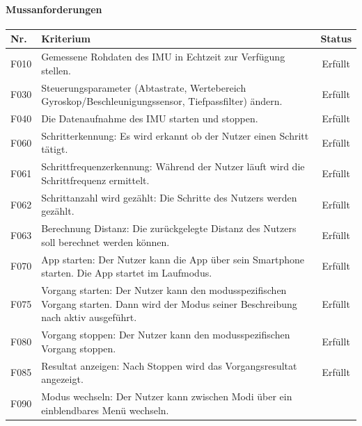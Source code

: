 \documentclass[a4paper,12pt]{article}
\begin{document}
\paragraph{Mussanforderungen}
\begin{center}
\begin{tabular}{ |m{1cm}| m{11cm} | c | } 
	\hline
	\textbf{Nr.} & \textbf{Kriterium} & \textbf{Status}\\
	\hline   F010 & Gemessene Rohdaten des IMU in Echtzeit zur Verfügung stellen.
	&    \cellcolor{green!25} Erfüllt 
	\\  \hline   F030 & Steuerungsparameter (Abtastrate, Wertebereich Gyroskop/Beschleunigungssensor, Tiefpassfilter) ändern. %
	&    \cellcolor{green!25} Erfüllt 
	\\  \hline   F040 & Die Datenaufnahme des IMU starten und stoppen.
	&    \cellcolor{green!25} Erfüllt 
	\\  \hline   F060 & \textsf{Schritterkennung:} Es wird erkannt ob der Nutzer einen Schritt tätigt.
	&    \cellcolor{green!25} Erfüllt 
	\\  \hline   F061 & \textsf{Schrittfrequenzerkennung:} Während der Nutzer läuft wird die Schrittfrequenz ermittelt.
	&    \cellcolor{green!25} Erfüllt
	\\  \hline   F062 & \textsf{Schrittanzahl wird gezählt:} Die Schritte des Nutzers werden gezählt.
	&    \cellcolor{green!25} Erfüllt 
	\\  \hline   F063 & \textsf{Berechnung Distanz:} Die zurückgelegte Distanz des Nutzers soll berechnet werden können.
	&    \cellcolor{green!25} Erfüllt 
	\\  \hline   F070 & \textsf{App starten:} Der Nutzer kann die App über sein Smartphone starten. Die App startet im Laufmodus.
	&    \cellcolor{green!25} Erfüllt 
	\\  \hline   F075 & \textsf{Vorgang starten:} Der Nutzer kann den modusspezifischen Vorgang starten. Dann wird der Modus seiner Beschreibung nach aktiv ausgeführt.
	&    \cellcolor{green!25} Erfüllt 
	\\  \hline   F080 & \textsf{Vorgang stoppen:} Der Nutzer kann den modusspezifischen Vorgang stoppen.
	&    \cellcolor{green!25} Erfüllt 
	\\  \hline   F085 & \textsf{Resultat anzeigen:} Nach Stoppen wird das Vorgangsresultat angezeigt.
	&    \cellcolor{green!25} Erfüllt 
	\\  \hline   F090 & \textsf{Modus wechseln:} Der Nutzer kann zwischen Modi über ein einblendbares Menü wechseln.

\end{tabular}
\end{center}
\end{document}
